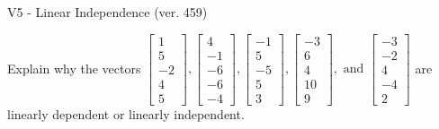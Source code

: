 \begin{exercise}
  \begin{exerciseTitle}V5 - Linear Independence (ver. 459)\end{exerciseTitle}
  \begin{exerciseStatement}
    Explain why the vectors \(\left[\begin{array}{r}
1 \\
5 \\
-2 \\
4 \\
5
\end{array}\right] , \left[\begin{array}{r}
4 \\
-1 \\
-6 \\
-6 \\
-4
\end{array}\right] , \left[\begin{array}{r}
-1 \\
5 \\
-5 \\
5 \\
3
\end{array}\right] , \left[\begin{array}{r}
-3 \\
6 \\
4 \\
10 \\
9
\end{array}\right] , \text{ and } \left[\begin{array}{r}
-3 \\
-2 \\
4 \\
-4 \\
2
\end{array}\right]\) are linearly dependent or linearly independent.	



\end{exerciseStatement}
\end{exercise}

